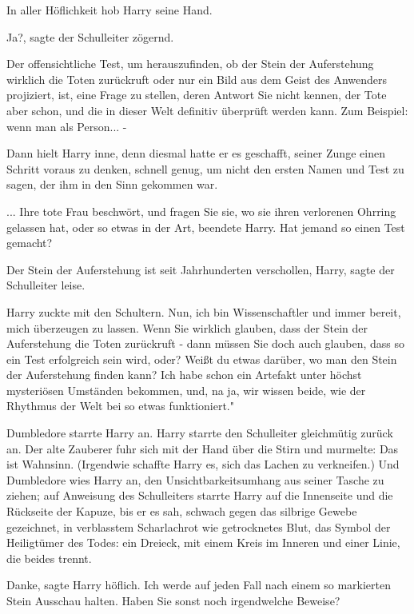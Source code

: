 In aller Höflichkeit hob Harry seine Hand.

\glqq Ja?\grqq{}, sagte der Schulleiter zögernd.

\glqq Der offensichtliche Test, um herauszufinden, ob der Stein der Auferstehung
wirklich die Toten zurückruft oder nur ein Bild aus dem Geist des Anwenders
projiziert, ist, eine Frage zu stellen, deren Antwort Sie nicht kennen, der Tote
aber schon, und die in dieser Welt definitiv überprüft werden kann. Zum
Beispiel: wenn man als Person... -\grqq{}

Dann hielt Harry inne, denn diesmal hatte er es geschafft, seiner Zunge einen
Schritt voraus zu denken, schnell genug, um nicht den ersten Namen und Test zu
sagen, der ihm in den Sinn gekommen war.

\glqq ... Ihre tote Frau beschwört, und fragen Sie sie, wo sie ihren verlorenen
Ohrring gelassen hat, oder so etwas in der Art\grqq{}, beendete Harry. \glqq Hat
jemand so einen Test gemacht?\grqq{}

\glqq Der Stein der Auferstehung ist seit Jahrhunderten verschollen,
Harry\grqq{}, sagte der Schulleiter leise.

Harry zuckte mit den Schultern. \glqq Nun, ich bin Wissenschaftler und immer
bereit, mich überzeugen zu lassen. Wenn Sie wirklich glauben, dass der Stein der
Auferstehung die Toten zurückruft - dann müssen Sie doch auch glauben, dass so
ein Test erfolgreich sein wird, oder? Weißt du etwas darüber, wo man den Stein
der Auferstehung finden kann? Ich habe schon ein Artefakt unter höchst
mysteriösen Umständen bekommen, und, na ja, wir wissen beide, wie der Rhythmus
der Welt bei so etwas funktioniert."

Dumbledore starrte Harry an. Harry starrte den Schulleiter gleichmütig zurück
an. Der alte Zauberer fuhr sich mit der Hand über die Stirn und murmelte: \glqq
Das ist Wahnsinn.\grqq{} (Irgendwie schaffte Harry es, sich das Lachen zu
verkneifen.) Und Dumbledore wies Harry an, den Unsichtbarkeitsumhang aus seiner
Tasche zu ziehen; auf Anweisung des Schulleiters starrte Harry auf die
Innenseite und die Rückseite der Kapuze, bis er es sah, schwach gegen das
silbrige Gewebe gezeichnet, in verblasstem Scharlachrot wie getrocknetes Blut,
das Symbol der Heiligtümer des Todes: ein Dreieck, mit einem Kreis im Inneren
und einer Linie, die beides trennt.

\glqq Danke\grqq{}, sagte Harry höflich. \glqq Ich werde auf jeden Fall nach
einem so markierten Stein Ausschau halten. Haben Sie sonst noch irgendwelche
Beweise?\grqq{}

